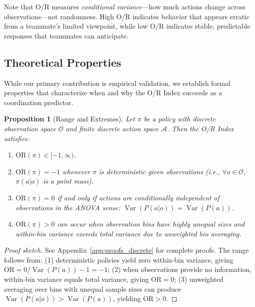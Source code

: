 \documentclass[twoside]{article}
\DeclareMathOperator{\Var}{Var}
\newtheorem{proposition}{Proposition}
\theoremstyle{remark}
\begin{document}
Note that O/R measures \textit{conditional variance}—how much actions change across observations—not randomness. High O/R indicates behavior that appears erratic from a teammate's limited viewpoint, while low O/R indicates stable, predictable responses that teammates can anticipate.


\subsection{Theoretical Properties}
\label{subsec:theory_properties}

While our primary contribution is empirical validation, we establish formal properties that characterize when and why the O/R Index succeeds as a coordination predictor.

\begin{proposition}[Range and Extremes]
\label{prop:range_extremes}
Let $\pi$ be a policy with discrete observation space $\mathcal{O}$ and finite discrete action space $\mathcal{A}$. Then the O/R Index satisfies:
\begin{enumerate}
    \item $\mathrm{OR}(\pi) \in [-1, \infty)$.
    \item $\mathrm{OR}(\pi) = -1$ whenever $\pi$ is deterministic given observations (i.e., $\forall o \in \mathcal{O}$, $\pi(a|o)$ is a point mass).
    \item $\mathrm{OR}(\pi) = 0$ if and only if actions are conditionally independent of observations in the ANOVA sense: $\Var(P(a|o)) = \Var(P(a))$.
    \item $\mathrm{OR}(\pi) > 0$ can occur when observation bins have highly unequal sizes and within-bin variance exceeds total variance due to unweighted bin averaging.
\end{enumerate}
\end{proposition}

\begin{proof}[Proof sketch]
See Appendix~\ref{app:proofs_discrete} for complete proofs. The range follows from: (1) deterministic policies yield zero within-bin variance, giving $\mathrm{OR} = 0/\Var(P(a)) - 1 = -1$; (2) when observations provide no information, within-bin variance equals total variance, giving $\mathrm{OR} = 0$; (3) unweighted averaging over bins with unequal sample sizes can produce $\Var(P(a|o)) > \Var(P(a))$, yielding $\mathrm{OR} > 0$.
\end{proof}
\end{document}

